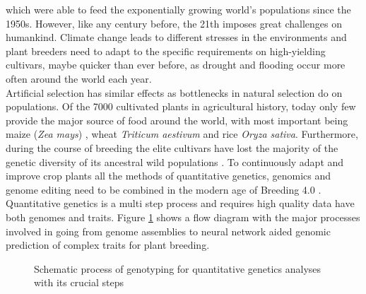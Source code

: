 which were able to feed the exponentially growing world's populations since the
1950s. However, like any century before, the 21th imposes great challenges on
humankind. Climate change leads to different stresses in the environments and plant
breeders need to adapt to the specific requirements on high-yielding cultivars, maybe
quicker than ever before, as drought and flooding occur more often around the world each
year. \\
Artificial selection has similar effects as bottlenecks in natural selection do on
populations. Of the 7000 cultivated plants in agricultural history, today only few provide
the major source of food around the world, with most important being maize (\textit{Zea
  mays}) , wheat \textit{Triticum aestivum} and rice \textit{Oryza sativa}.  Furthermore,
during the course of breeding the elite cultivars have lost the majority of the genetic
diversity of its ancestral wild populations \cite{walsh2018}. To continuously adapt and
improve crop plants all the methods of quantitative genetics, genomics and genome editing
need to be combined in the modern age of Breeding 4.0 \cite{wallace2018road}. \\
Quantitative genetics is a multi step process and requires high quality data have both
genomes and traits. Figure \ref{fig:quan_flow1} shows a flow diagram with the major
processes involved in going from genome assemblies to neural network aided genomic
prediction of complex traits for plant breeding. 


\begin{figure}[H]
  \begin{center}
    \caption[Schematic process of genotyping for quantitative genetics]{Schematic process of genotyping for quantitative genetics analyses with its crucial steps} \label{fig:quan_flow1}
  \end{center}     
\end{figure}

